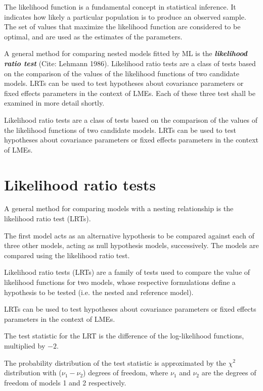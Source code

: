 \documentclass[12pt, a4paper]{report}
\theoremstyle{plain}
\theoremstyle{definition}
\theoremstyle{remark}
\begin{document}
The likelihood function is a fundamental concept in statistical inference. It indicates how likely a particular population is to produce an observed sample. The set of values that maximize the likelihood function are considered to be optimal, and are used as the estimates of the parameters.


A general method for comparing nested models fitted by ML is the \textbf{\emph{likelihood ratio test}} (Cite: Lehmann 1986).  Likelihood ratio tests are a class of tests based on the comparison of the values of the likelihood functions of two candidate models. LRTs can be used to test hypotheses about covariance parameters or fixed effects parameters in the context of LMEs.  Each of these three test shall be examined in more detail shortly.

Likelihood ratio tests are a class of tests based on the
comparison of the values of the likelihood functions of two
candidate models. LRTs can be used to test hypotheses about
covariance parameters or fixed effects parameters in the context
of LMEs.



 




\section{Likelihood ratio tests}
A general method for comparing models with a nesting relationship is the likelihood ratio test (LRTs). 

The first model acts as an alternative hypothesis to be compared against each of three other models, acting as null hypothesis models, successively. The models are compared using the likelihood ratio test. 
\bigskip

Likelihood ratio tests (LRTs) are a family of tests used to compare the value of likelihood functions for two models, whose respective formulations define a hypothesis to be tested (i.e. the nested and reference model).


LRTs can be used to test hypotheses about
covariance parameters or fixed effects parameters in the context
of LMEs.

The test statistic for the LRT is the difference of the log-likelihood functions, multiplied by $-2$.

The probability distribution of the test statistic is approximated by the $\chi^2$ distribution with ($\nu_{1} - \nu_{2}$) degrees of freedom, where $\nu_{1}$  and $\nu_{2}$ are the degrees of freedom of models 1 and 2 respectively.
\end{document}
